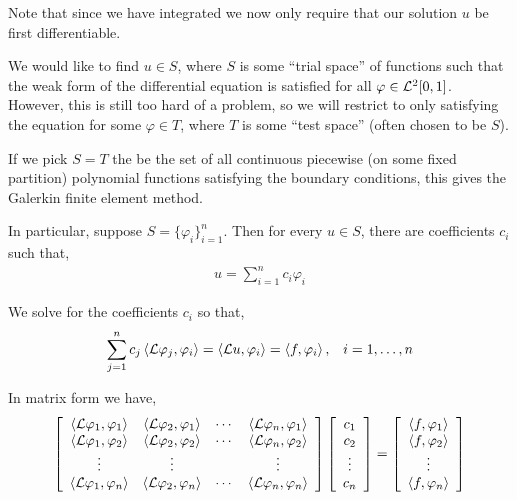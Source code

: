 \documentclass[12pt]{article}
\begin{document}
Note that since we have integrated we now only require that our solution \( u \) be first differentiable.

We would like to find \( u\in S \), where \( S \) is some ``trial space'' of functions such that the weak form of the differential equation is satisfied for all \( \varphi \in \mathcal{L}^2[0,1] \). However, this is still too hard of a problem, so we will restrict to only satisfying the equation for some \( \varphi \in T \), where \( T \) is some ``test space'' (often chosen to be \( S \)).

If we pick \( S = T  \) the be the set of all continuous piecewise (on some fixed partition) polynomial functions satisfying the boundary conditions, this gives the Galerkin finite element method.

In particular, suppose \( S = \{\varphi_i\}_{i=1}^{n} \).
Then for every \( u\in S \), there are coefficients \( c_i \) such that,
\begin{align*}
    u = \sum_{i=1}^{n} c_i \varphi_i
\end{align*}

We solve for the coefficients \( c_i \) so that,
\begin{align*}
    \sum_{j=1}^{n} c_j\left\langle \mathcal{L} \varphi_j,\varphi_i \right\rangle
    = \left\langle \mathcal{L} u, \varphi_i \right\rangle = \left\langle f,\varphi_i \right\rangle, && i=1,\ldots, n
\end{align*}

In matrix form we have,
\begin{align*}
    \left[\begin{array}{ccccc}
    \left\langle \mathcal{L} \varphi_1, \varphi_1 \right\rangle & \left\langle \mathcal{L} \varphi_2,\varphi_1 \right\rangle & \cdots & \left\langle \mathcal{L} \varphi_n,\varphi_1 \right\rangle \\
    \left\langle \mathcal{L} \varphi_1, \varphi_2 \right\rangle & \left\langle \mathcal{L} \varphi_2,\varphi_2 \right\rangle & \cdots & \left\langle \mathcal{L} \varphi_n,\varphi_2 \right\rangle \\
    \vdots & \vdots & & \vdots \\
    \left\langle \mathcal{L} \varphi_1, \varphi_n \right\rangle & \left\langle \mathcal{L} \varphi_2,\varphi_n \right\rangle & \cdots & \left\langle \mathcal{L} \varphi_n,\varphi_n \right\rangle \\
    \end{array}\right]
    \left[\begin{array}{c} c_1 \\ c_2 \\ \vdots \\ c_n\end{array}\right]
    =
    \left[\begin{array}{c} \left\langle f,\varphi_1 \right\rangle \\ \left\langle f,\varphi_2 \right\rangle \\ \vdots \\ \left\langle f,\varphi_n \right\rangle \end{array}\right]
\end{align*}
\end{document}

